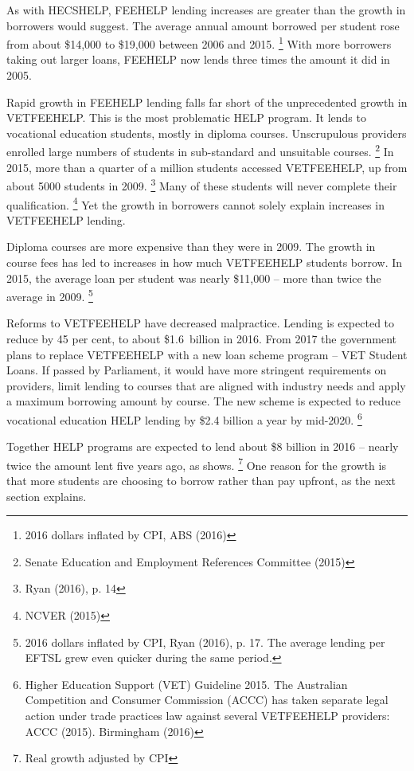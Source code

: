 \documentclass[embargoed]{grattan}
\begin{document}
As with \gls{HECSHELP}, \gls{FEEHELP} lending increases are greater than the growth in borrowers would suggest.
The average annual amount borrowed per student rose from about \$14,000 to \$19,000 between 2006 and 2015.%
\footnote{2016 dollars inflated by \gls{CPI}, ABS (2016)} With more borrowers taking out larger loans, \gls{FEEHELP} now lends three times the amount it did in 2005.

Rapid growth in \gls{FEEHELP} lending falls far short of the unprecedented growth in \gls{VETFEEHELP}.
This is the most problematic \gls{HELP} program.
It lends to vocational education students, mostly in diploma courses.
Unscrupulous providers enrolled large numbers of students in sub-standard and unsuitable courses.%
\footnote{Senate Education and Employment References Committee (2015)} In 2015, more than a quarter of a million students accessed \gls{VETFEEHELP}, up from about 5000 students in 2009.%
\footnote{Ryan (2016), p. 14} Many of these students will never complete their qualification.%
\footnote{NCVER (2015)} Yet the growth in borrowers cannot solely explain increases in \gls{VETFEEHELP} lending.

Diploma courses are more expensive than they were in 2009.
The growth in course fees has led to increases in how much \gls{VETFEEHELP} students borrow.
In 2015, the average loan per student was nearly \$11,000 -- more than twice the average in 2009.%
\footnote{2016 dollars inflated by \gls{CPI}, Ryan (2016), p. 17.
The average lending per \gls{EFTSL} grew even quicker during the same period.}

Reforms to \gls{VETFEEHELP} have decreased malpractice.
Lending is expected to reduce by 45 per cent, to about \$1.6~billion in 2016.
From 2017 the government plans to replace \gls{VETFEEHELP} with a new loan scheme program -- VET Student Loans.
If passed by Parliament, it would have more stringent requirements on providers, limit lending to courses that are aligned with industry needs and apply a maximum borrowing amount by course.
The new scheme is expected to reduce vocational education \gls{HELP} lending by \$2.4 billion a year by mid-2020.%
\footnote{Higher Education Support (VET) Guideline 2015.
The Australian Competition and Consumer Commission (ACCC) has taken separate legal action under trade practices law against several \gls{VETFEEHELP} providers: ACCC (2015).
Birmingham (2016)}

Together \gls{HELP} programs are expected to lend about \$8 billion in 2016 -- nearly twice the amount lent five years ago, as  shows.%
\footnote{Real growth adjusted by \gls{CPI}} One reason for the growth is that more students are choosing to borrow rather than pay upfront, as the next section explains.
\end{document}
